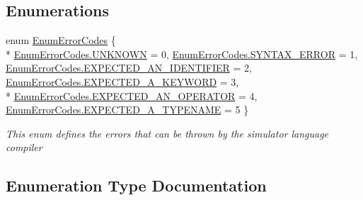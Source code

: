 \subsection*{Enumerations}
\begin{DoxyCompactItemize}
\item 
enum \hyperlink{namespace_c_p_u___o_s___simulator_1_1_compiler_1_1_frontend_a268b68f35fd94ce3549dd33a7e77d7e8}{Enum\+Error\+Codes} \{ \\*
\hyperlink{namespace_c_p_u___o_s___simulator_1_1_compiler_1_1_frontend_a268b68f35fd94ce3549dd33a7e77d7e8a696b031073e74bf2cb98e5ef201d4aa3}{Enum\+Error\+Codes.\+U\+N\+K\+N\+O\+W\+N} = 0, 
\hyperlink{namespace_c_p_u___o_s___simulator_1_1_compiler_1_1_frontend_a268b68f35fd94ce3549dd33a7e77d7e8a756ec3dd26d1a73363eb3e68b6e820df}{Enum\+Error\+Codes.\+S\+Y\+N\+T\+A\+X\+\_\+\+E\+R\+R\+O\+R} = 1, 
\hyperlink{namespace_c_p_u___o_s___simulator_1_1_compiler_1_1_frontend_a268b68f35fd94ce3549dd33a7e77d7e8aaa07d36fd7f47f0418447b6bfca4439a}{Enum\+Error\+Codes.\+E\+X\+P\+E\+C\+T\+E\+D\+\_\+\+A\+N\+\_\+\+I\+D\+E\+N\+T\+I\+F\+I\+E\+R} = 2, 
\hyperlink{namespace_c_p_u___o_s___simulator_1_1_compiler_1_1_frontend_a268b68f35fd94ce3549dd33a7e77d7e8acb3bfc44b4be4778a01045556f0a56b7}{Enum\+Error\+Codes.\+E\+X\+P\+E\+C\+T\+E\+D\+\_\+\+A\+\_\+\+K\+E\+Y\+W\+O\+R\+D} = 3, 
\\*
\hyperlink{namespace_c_p_u___o_s___simulator_1_1_compiler_1_1_frontend_a268b68f35fd94ce3549dd33a7e77d7e8af7359c8ef850f987f8f8198411bfedbb}{Enum\+Error\+Codes.\+E\+X\+P\+E\+C\+T\+E\+D\+\_\+\+A\+N\+\_\+\+O\+P\+E\+R\+A\+T\+O\+R} = 4, 
\hyperlink{namespace_c_p_u___o_s___simulator_1_1_compiler_1_1_frontend_a268b68f35fd94ce3549dd33a7e77d7e8a6d94d7d4db3edea858fce83c2f41aa9f}{Enum\+Error\+Codes.\+E\+X\+P\+E\+C\+T\+E\+D\+\_\+\+A\+\_\+\+T\+Y\+P\+E\+N\+A\+M\+E} = 5
 \}\begin{DoxyCompactList}\small\item\em This enum defines the errors that can be thrown by the simulator language compiler \end{DoxyCompactList}
\end{DoxyCompactItemize}


\subsection{Enumeration Type Documentation}
\hypertarget{namespace_c_p_u___o_s___simulator_1_1_compiler_1_1_frontend_a268b68f35fd94ce3549dd33a7e77d7e8}{}
